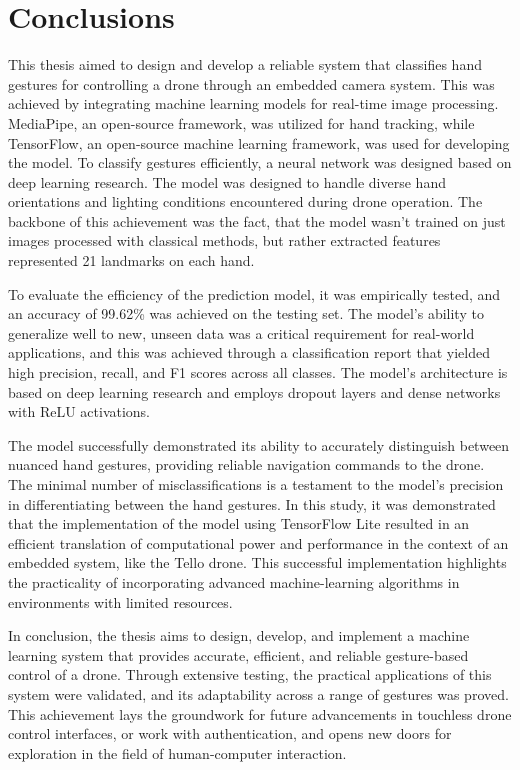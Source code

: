 \chapter{Conclusions}
This thesis aimed to design and develop a reliable system that classifies hand gestures for controlling a drone through an embedded camera system. This was achieved by integrating machine learning models for real-time image processing. MediaPipe, an open-source framework, was utilized for hand tracking, while TensorFlow, an open-source machine learning framework, was used for developing the model. To classify gestures efficiently, a neural network was designed based on deep learning research. The model was designed to handle diverse hand orientations and lighting conditions encountered during drone operation. The backbone of this achievement was the fact, that the model wasn't trained on just images processed with classical methods, but rather extracted features represented 21 landmarks on each hand.

To evaluate the efficiency of the prediction model, it was empirically tested, and an accuracy of 99.62\% was achieved on the testing set. The model's ability to generalize well to new, unseen data was a critical requirement for real-world applications, and this was achieved through a classification report that yielded high precision, recall, and F1 scores across all classes. The model's architecture is based on deep learning research and employs dropout layers and dense networks with ReLU activations.

The model successfully demonstrated its ability to accurately distinguish between nuanced hand gestures, providing reliable navigation commands to the drone. The minimal number of misclassifications is a testament to the model's precision in differentiating between the hand gestures.
In this study, it was demonstrated that the implementation of the model using TensorFlow Lite resulted in an efficient translation of computational power and performance in the context of an embedded system, like the Tello drone. This successful implementation highlights the practicality of incorporating advanced machine-learning algorithms in environments with limited resources. 

In conclusion, the thesis aims to design, develop, and implement a machine learning system that provides accurate, efficient, and reliable gesture-based control of a drone. Through extensive testing, the practical applications of this system were validated, and its adaptability across a range of gestures was proved. This achievement lays the groundwork for future advancements in touchless drone control interfaces, or work with authentication, and opens new doors for exploration in the field of human-computer interaction.
